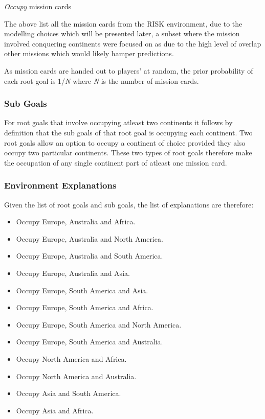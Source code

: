 \documentclass[parskip]{cs4rep}
\begin{document}
\textit{Occupy} mission cards  

The above list all the mission cards from the RISK environment, due to the modelling choices which will be presented later, a subset where the mission involved conquering continents were focused on as due to the high level of overlap other missions which would likely hamper predictions.

As mission cards are handed out to players' at random, the prior probability of each root goal is 1/\textit{N} where \textit{N} is the number of mission cards.

\subsubsection{Sub Goals}

For root goals that involve occupying atleast two continents it follows by definition that the sub goals of that root goal is occupying each continent. Two root goals allow an option to occupy a continent of choice provided they also occupy two particular continents. These two types of root goals therefore make the occupation of any single continent part of atleast one mission card.  

\subsubsection{Environment Explanations}

Given the list of root goals and sub goals, the list of explanations are therefore:

\begin{itemize}
\item
Occupy Europe, Australia and Africa.
\item
Occupy Europe, Australia and North America.
\item
Occupy Europe, Australia and South America.
\item
Occupy Europe, Australia and Asia.
\item
Occupy Europe, South America and Asia.
\item
Occupy Europe, South America and Africa.
\item
Occupy Europe, South America and North America.
\item
Occupy Europe, South America and Australia.
\item
Occupy North America and Africa.
\item
Occupy North America and Australia.
\item
Occupy Asia and South America.
\item
Occupy Asia and Africa.
\newline
\end{itemize}
\end{document}
